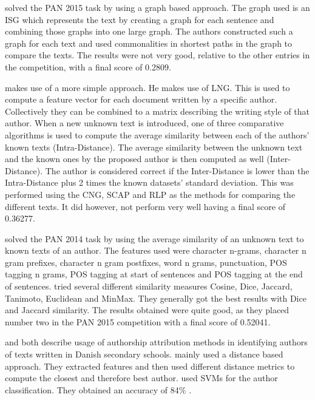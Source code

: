 \cite{gomezadorno2015} solved the PAN 2015 task by using a graph based approach.
The graph used is an \gls{ISG} which represents the text by creating a graph
for each sentence and combining those graphs into one large graph. The authors
constructed such a graph for each text and used commonalities in shortest paths
in the graph to compare the texts. The results were not very good, relative to
the other entries in the competition, with a final score of 0.2809.


\cite{layton:2014} makes use of a more simple approach. He makes use of
\gls{LNG}. This is used to compute a feature vector for each document written
by a specific author. Collectively they can be combined to a matrix describing
the writing style of that author. When a new unknown text is introduced, one of
three comparative algorithms is used to compute the average similarity between
each of the authors' known texts (Intra-Distance). The average similarity
between the unknown text and the known ones by the proposed author is then
computed as well (Inter-Distance). The author is considered correct if the
Inter-Distance is lower than the Intra-Distance plus 2 times the known datasets'
standard deviation. This was performed using the \gls{CNG}, \gls{SCAP} and
\gls{RLP} as the methods for comparing the different texts. It did however, not
perform very well having a final score of 0.36277.

\cite{castro2015} solved the PAN 2014 task by using the average similarity of
an unknown text to known texts of an author. The features used were character
n-grams, character n gram prefixes, character n gram postfixes, word n grams,
punctuation, \gls{POS} tagging n grams, \gls{POS} tagging at start of sentences
and \gls{POS} tagging at the end of sentences. \cite{castro2015} tried several
different similarity measures Cosine, Dice, Jaccard, Tanimoto, Euclidean and
MinMax. They generally got the best results with Dice and Jaccard similarity.
The results obtained were quite good, as they placed number two in the PAN 2015
competition with a final score of 0.52041.

\cite{hansen2014} and \cite{aalykke2016} both describe usage of authorship
attribution methods in identifying authors of texts written in Danish secondary
schools. \cite{aalykke2016} mainly used a distance based approach. They
extracted features and then used different distance metrics to compute the
closest and therefore best author. \cite{hansen2014} used \gls{SVM}s for the
author classification. They obtained an accuracy of 84\% .
